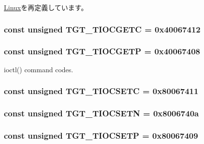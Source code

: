 \hyperlink{classLinux_a96e06e042526ea5e89c4e8a020636c52}{Linux}を再定義しています。\hypertarget{classPowerLinux_ad4f95fbdb4f52f68481c247267675007}{
\subsubsection[{TGT\_\-TIOCGETC}]{\setlength{\rightskip}{0pt plus 5cm}const unsigned {\bf TGT\_\-TIOCGETC} = 0x40067412}}
\label{classPowerLinux_ad4f95fbdb4f52f68481c247267675007}
\hypertarget{classPowerLinux_a90fcc56bd4aa74a5d86c87bfeae77625}{
\subsubsection[{TGT\_\-TIOCGETP}]{\setlength{\rightskip}{0pt plus 5cm}const unsigned {\bf TGT\_\-TIOCGETP} = 0x40067408}}
\label{classPowerLinux_a90fcc56bd4aa74a5d86c87bfeae77625}


ioctl() command codes. \hypertarget{classPowerLinux_a98595955a801e37d1d5be450c203afe5}{
\subsubsection[{TGT\_\-TIOCSETC}]{\setlength{\rightskip}{0pt plus 5cm}const unsigned {\bf TGT\_\-TIOCSETC} = 0x80067411}}
\label{classPowerLinux_a98595955a801e37d1d5be450c203afe5}
\hypertarget{classPowerLinux_a6783bea53088dc89157c39a9a7c71988}{
\subsubsection[{TGT\_\-TIOCSETN}]{\setlength{\rightskip}{0pt plus 5cm}const unsigned {\bf TGT\_\-TIOCSETN} = 0x8006740a}}
\label{classPowerLinux_a6783bea53088dc89157c39a9a7c71988}
\hypertarget{classPowerLinux_a194059e48b091a80833c40b500e70bec}{
\subsubsection[{TGT\_\-TIOCSETP}]{\setlength{\rightskip}{0pt plus 5cm}const unsigned {\bf TGT\_\-TIOCSETP} = 0x80067409}}
\label{classPowerLinux_a194059e48b091a80833c40b500e70bec}


